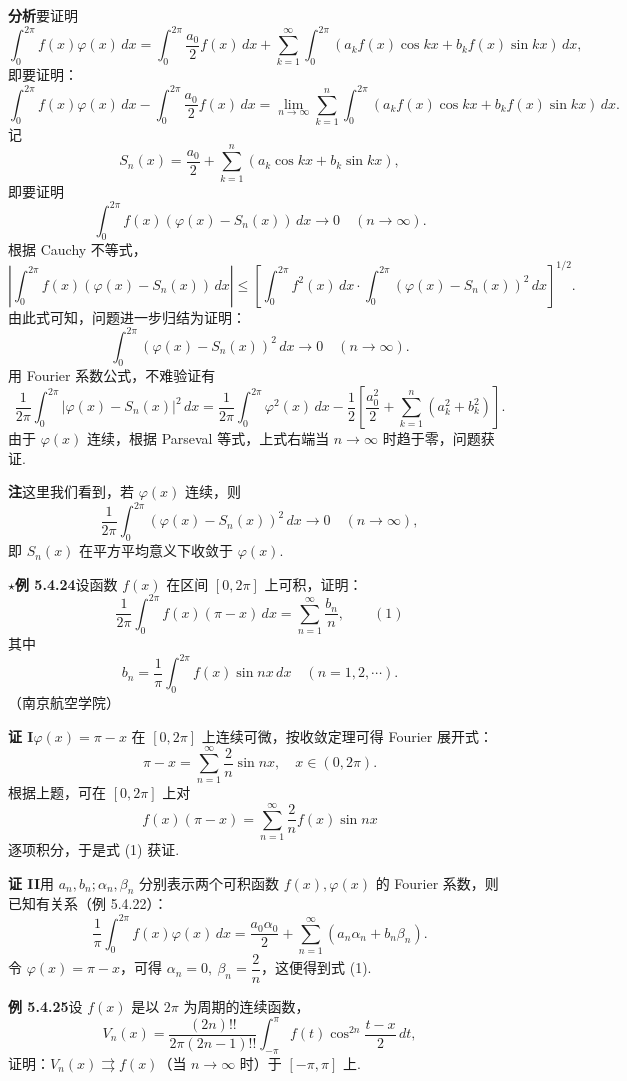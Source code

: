 \documentclass[UTF8, 12pt, fontset=fandol, oneside]{ctexart}
\begin{document}
\noindent\textbf{分析}\quad 要证明
\[
  \int_0^{2\pi}f(x)\varphi(x)\,dx
  =\int_0^{2\pi}\frac{a_0}{2}f(x)\,dx+
  \sum_{k=1}^{\infty}\int_0^{2\pi}(a_kf(x)\cos kx+b_kf(x)\sin kx)\,dx,
\]
即要证明：
\[
  \int_0^{2\pi}f(x)\varphi(x)\,dx-\int_0^{2\pi}\frac{a_0}{2}f(x)\,dx
  =\lim_{n\to\infty}\sum_{k=1}^{n}\int_0^{2\pi}(a_kf(x)\cos kx+b_kf(x)\sin kx)\,dx.
\]
记
\[
  S_n(x)=\frac{a_0}{2}+\sum_{k=1}^{n}(a_k\cos kx+b_k\sin kx),
\]
即要证明
\[
  \int_0^{2\pi}f(x)(\varphi(x)-S_n(x))\,dx\to0\quad(n\to\infty).
\]
根据 Cauchy 不等式，
\[
  \left|\int_0^{2\pi}f(x)(\varphi(x)-S_n(x))\,dx\right|
  \le\left[\int_0^{2\pi}f^2(x)\,dx\cdot
  \int_0^{2\pi}(\varphi(x)-S_n(x))^2\,dx\right]^{1/2}.
\]
由此式可知，问题进一步归结为证明：
\[
  \int_0^{2\pi}(\varphi(x)-S_n(x))^2\,dx\to0\quad(n\to\infty).
\]
用 Fourier 系数公式，不难验证有
\[
  \frac1{2\pi}\int_0^{2\pi}|\varphi(x)-S_n(x)|^2\,dx
  =\frac1{2\pi}\int_0^{2\pi}\varphi^2(x)\,dx
  -\frac12\left[\frac{a_0^2}{2}+\sum_{k=1}^{n}(a_k^2+b_k^2)\right].
\]
由于 $\varphi(x)$ 连续，根据 Parseval 等式，上式右端当 $n\to\infty$ 时趋于零，问题获证.

\noindent\textbf{注}\quad 这里我们看到，若 $\varphi(x)$ 连续，则
\[
  \frac1{2\pi}\int_0^{2\pi}(\varphi(x)-S_n(x))^2\,dx\to0\quad(n\to\infty),
\]
即 $S_n(x)$ 在平方平均意义下收敛于 $\varphi(x)$.

\noindent\(\star\)\textbf{例 5.4.24}\quad 设函数 $f(x)$ 在区间 $[0,2\pi]$ 上可积，证明：
\[
  \frac1{2\pi}\int_0^{2\pi}f(x)(\pi-x)\,dx=\sum_{n=1}^{\infty}\frac{b_n}{n}, \qquad(1)
\]
其中
\[
  b_n=\frac1\pi\int_0^{2\pi}f(x)\sin nx\,dx\quad(n=1,2,\cdots).
\]
（南京航空学院）

\noindent\textbf{证 I}\quad $\varphi(x)=\pi-x$ 在 $[0,2\pi]$ 上连续可微，按收敛定理可得 Fourier 展开式：
\[
  \pi-x=\sum_{n=1}^{\infty}\frac2n\sin nx,\quad x\in(0,2\pi).
\]
根据上题，可在 $[0,2\pi]$ 上对
\[
  f(x)(\pi-x)=\sum_{n=1}^{\infty}\frac2n f(x)\sin nx
\]
逐项积分，于是式 (1) 获证.

\noindent\textbf{证 II}\quad 用 $a_n,b_n;\alpha_n,\beta_n$ 分别表示两个可积函数 $f(x),\varphi(x)$ 的 Fourier 系数，则已知有关系（例 5.4.22）：
\[
  \frac1\pi\int_0^{2\pi}f(x)\varphi(x)\,dx
  =\frac{a_0\alpha_0}{2}+\sum_{n=1}^{\infty}(a_n\alpha_n+b_n\beta_n).
\]
令 $\varphi(x)=\pi-x$，可得 $\alpha_n=0,\ \beta_n=\dfrac2n$，这便得到式 (1).

\noindent\textbf{例 5.4.25}\quad 设 $f(x)$ 是以 $2\pi$ 为周期的连续函数，
\[
  V_n(x)=\frac{(2n)!!}{2\pi(2n-1)!!}\int_{-\pi}^{\pi}f(t)\cos^{2n}\frac{t-x}{2}\,dt,
\]
证明：$V_n(x)\rightrightarrows f(x)$（当 $n\to\infty$ 时）于 $[-\pi,\pi]$ 上.
\end{document}
